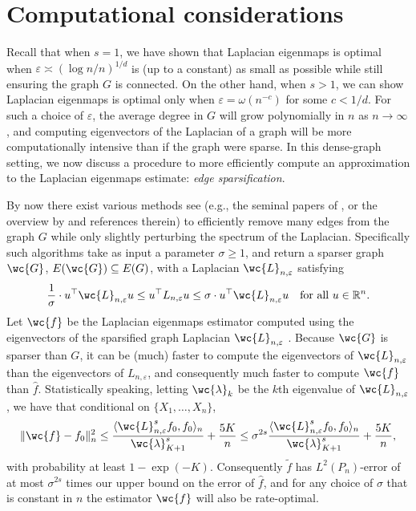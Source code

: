 \documentclass[aos]{imsart}
\theoremstyle{plain}
\theoremstyle{definition}
\theoremstyle{remark}
\def\R{\mathbb{R}}
\newcommand{\dotp}[2]{\langle #1, #2 \rangle}
\newcommand{\wt}[1]{\widetilde{#1}}
\newcommand{\wh}[1]{\widehat{#1}}
\newcommand{\Reals}{\mathbb{R}} %
\newcommand{\1}{\mathbf{1}}
\begin{document}
\section{Computational considerations}
\label{sec:computational_considerations}
Recall that when $s = 1$, we have shown that Laplacian eigenmaps is optimal when $\varepsilon \asymp (\log n/n)^{1/d}$ is (up to a constant) as small as possible while still ensuring the graph $G$ is connected. On the other hand, when $s > 1$, we can show Laplacian eigenmaps is optimal only when $\varepsilon = \omega(n^{-c})$ for some $c < 1/d$. For such a choice of $\varepsilon$, the average degree in $G$ will grow polynomially in $n$ as $n \to \infty$, and computing eigenvectors of the Laplacian of a graph will be more computationally intensive than if the graph were sparse. 
In this dense-graph setting, we now discuss a procedure to more efficiently compute an approximation to the Laplacian eigenmaps estimate: \emph{edge sparsification}.

By now there exist various methods see (e.g., the seminal papers of \citet{spielman2011,spielman2013,spielman2014}, or the overview by \citet{vishnoi2012} and references therein) to efficiently remove many edges from the graph $G$ while only slightly perturbing the spectrum of the Laplacian. Specifically such algorithms take as input a parameter $\sigma \geq 1$, and return a sparser graph $\wc{G}$, $E(\wc{G}) \subseteq E(G)$, with a Laplacian $\wc{L}_{n,\varepsilon}$ satisfying
\begin{equation*}
\frac{1}{\sigma} \cdot u^{\top} \wc{L}_{n,\varepsilon} u \leq u^{\top} L_{n,\varepsilon} u \leq \sigma \cdot u^{\top} \wc{L}_{n,\varepsilon}u \quad \textrm{for all $u \in \Reals^n$.}
\end{equation*}
Let $\wc{f}$ be the Laplacian eigenmaps estimator computed using the eigenvectors of the sparsified graph Laplacian $\wc{L}_{n,\varepsilon}$ . Because $\wc{G}$ is sparser than $G$, it can be (much) faster to compute the eigenvectors of $\wc{L}_{n,\varepsilon}$ than the eigenvectors of $L_{n,\varepsilon}$, and consequently much faster to compute $\wc{f}$ than $\wh{f}$. Statistically speaking, letting $\wc{\lambda}_k$ be the $k$th eigenvalue of $\wc{L}_{n,\varepsilon}$, we have that conditional on $\{X_1,\ldots,X_n\}$,
\begin{equation*}
\|\wc{f} - f_0\|_n^2 \leq \frac{\dotp{\wc{L}_{n,\varepsilon}^s f_0}{f_0}_n}{\wc{\lambda}_{K + 1}^s} + \frac{5K}{n} \leq \sigma^{2s} \frac{\dotp{\wc{L}_{n,\varepsilon}^s f_0}{f_0}_n}{\wc{\lambda}_{K + 1}^s} + \frac{5K}{n},
\end{equation*}
with probability at least $1 - \exp(-K)$. Consequently $\wt{f}$ has $L^2(P_n)$-error of at most $\sigma^{2s}$ times our upper bound on the error of $\wh{f}$, and for any choice of $\sigma$ that is constant in $n$ the estimator $\wc{f}$ will also be rate-optimal. 
\end{document}
